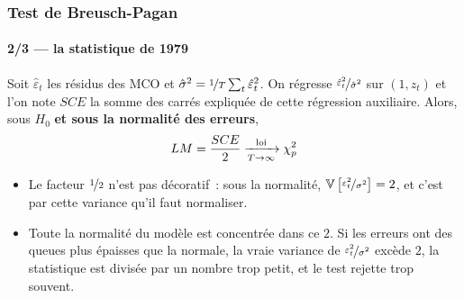 \documentclass[10pt]{beamer}
\begin{document}
\begin{frame}
  \frametitle{Test de Breusch-Pagan}
  \framesubtitle{2/3 --- la statistique de 1979}

  \begin{prop}\label{prop:bp:original}
    Soit $\hat\varepsilon_t$ les résidus des MCO et
    $\hat\sigma^2 = \nicefrac{1}{T}\sum_t \hat\varepsilon_t^2$. On régresse
    $\nicefrac{\hat\varepsilon_t^2}{\hat\sigma^2}$ sur $(1, z_t)$ et l'on note
    $SCE$ la somme des carrés expliquée de cette régression auxiliaire. Alors,
    sous $H_0$ \textbf{et sous la normalité des erreurs},
    \[
      LM = \frac{SCE}{2} \xrightarrow[T\rightarrow\infty]{\text{loi}} \chi^2_p
    \]
  \end{prop}

  \bigskip

  \begin{itemize}

  \item Le facteur $\nicefrac{1}{2}$ n'est pas décoratif~: sous la normalité,
    $\mathbb V\left[\nicefrac{\varepsilon_t^2}{\sigma^2}\right] = 2$, et c'est
    par cette variance qu'il faut normaliser.\newline

  \item[\dbend] Toute la normalité du modèle est concentrée dans ce $2$. Si les
    erreurs ont des queues plus épaisses que la normale, la vraie variance de
    $\nicefrac{\varepsilon_t^2}{\sigma^2}$ excède $2$, la statistique est
    divisée par un nombre trop petit, et le test rejette trop souvent.

  \end{itemize}

\end{frame}
\end{document}
